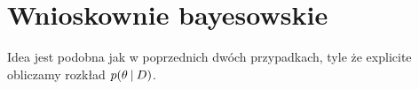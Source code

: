 \section{Wnioskownie bayesowskie}

Idea jest podobna jak w poprzednich dwóch przypadkach, tyle że explicite obliczamy rozkład \( p(\theta \:\vert\: D) \).